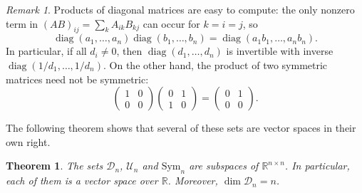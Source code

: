 \documentclass[11pt]{article}
\theoremstyle{definition}
\theoremstyle{plain}
\newtheorem{theorem}[definition]{Theorem}
\theoremstyle{remark}
\newtheorem{remark}[definition]{Remark}
\DeclareMathOperator{\diag}{diag}
\begin{document}
\begin{remark}
    Products of diagonal matrices are easy to compute: the only nonzero term in $(AB)_{ij} = \sum_k A_{ik} B_{kj}$ can occur for $k = i = j$, so
    \[\diag(a_1, \ldots, a_n) \diag(b_1, \ldots, b_n) = \diag(a_1 b_1, \ldots, a_n b_n).\]
    In particular, if all $d_i \neq 0$, then $\diag(d_1, \ldots, d_n)$ is invertible with inverse $\diag(1/d_1, \ldots, 1/d_n)$. On the other hand, the product of two symmetric matrices need not be symmetric:
    \[\begin{pmatrix}
        1 & 0 \\
        0 & 0
    \end{pmatrix} \begin{pmatrix}
        0 & 1 \\
        1 & 0
    \end{pmatrix} = \begin{pmatrix}
        0 & 1 \\
        0 & 0
    \end{pmatrix}.\]
\end{remark}

The following theorem shows that several of these sets are vector spaces in their own right.

\begin{theorem}\label{thm:special-subspaces}
    The sets $\mathcal{D}_n$, $\mathcal{U}_n$ and $\mathrm{Sym}_n$ are subspaces of $\mathbb{R}^{n \times n}$. In particular, each of them is a vector space over $\mathbb{R}$. Moreover, $\dim \mathcal{D}_n = n$.
\end{theorem}
\end{document}
